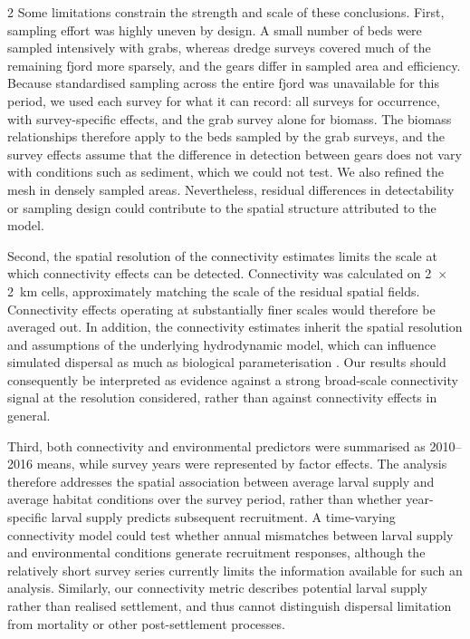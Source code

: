 \begin{spacing}{2}
Some limitations constrain the strength and scale of these conclusions. First, sampling effort was highly uneven by design. A small number of beds were sampled intensively with grabs, whereas dredge surveys covered much of the remaining fjord more sparsely, and the gears differ in sampled area and efficiency. Because standardised sampling across the entire fjord was unavailable for this period, we used each survey for what it can record: all surveys for occurrence, with survey-specific effects, and the grab survey alone for biomass. The biomass relationships therefore apply to the beds sampled by the grab surveys, and the survey effects assume that the difference in detection between gears does not vary with conditions such as sediment, which we could not test. We also refined the mesh in densely sampled areas. Nevertheless, residual differences in detectability or sampling design could contribute to the spatial structure attributed to the model.

Second, the spatial resolution of the connectivity estimates limits the scale at which connectivity effects can be detected. Connectivity was calculated on 2~$\times$2~km cells, approximately matching the scale of the residual spatial fields. Connectivity effects operating at substantially finer scales would therefore be averaged out. In addition, the connectivity estimates inherit the spatial resolution and assumptions of the underlying hydrodynamic model, which can influence simulated dispersal as much as biological parameterisation \citep{sciasciaLarvalDispersalSimulations2022,saint-amandBiophysicalModelsResolution2023}. Our results should consequently be interpreted as evidence against a strong broad-scale connectivity signal at the resolution considered, rather than against connectivity effects in general.

Third, both connectivity and environmental predictors were summarised as 2010–2016 means, while survey years were represented by factor effects. The analysis therefore addresses the spatial association between average larval supply and average habitat conditions over the survey period, rather than whether year-specific larval supply predicts subsequent recruitment. A time-varying connectivity model could test whether annual mismatches between larval supply and environmental conditions generate recruitment responses, although the relatively short survey series currently limits the information available for such an analysis. Similarly, our connectivity metric describes potential larval supply rather than realised settlement, and thus cannot distinguish dispersal limitation from mortality or other post-settlement processes.


\end{spacing}
